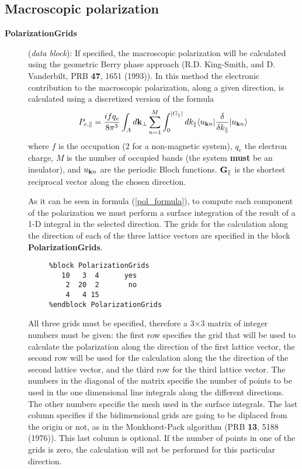 \documentclass[11pt]{article}
\begin{document}
\vspace{5pt}
\subsection{Macroscopic polarization}

\begin{description}

\item[{\bf PolarizationGrids}] ({\it data block}):
If specified, the macroscopic polarization will be calculated using the
geometric Berry phase approach (R.D. King-Smith, and D. Vanderbilt,
PRB {\bf 47}, 1651 (1993)). In this method the electronic
contribution to the macroscopic polarization, along a given direction,
is calculated using
a discretized version of the formula
\begin{equation}
\label{pol_formula}
    P_{e,\parallel}={ifq_e \over 8\pi^3} \int_A d{\bf k}_\perp
    \sum_{n=1}^M \int_0^{|G_\parallel|} dk_{\parallel}
     \langle u_{{\bf k} n} |{\delta \over \delta k_{\parallel}} |
      u_{{\bf k} n} \rangle
\end{equation}
where $f$ is the occupation (2 for a non-magnetic system),
$q_e$ the electron charge, $M$ is the number of occupied bands (the
system {\bf must} be an insulator), and $u_{{\bf k} n}$ are
the periodic Bloch functions. ${\bf G}_\parallel$ is the shortest
reciprocal vector along the chosen direction.

As it can be seen in formula (\ref{pol_formula}), to compute each
component of the polarization we must perform a surface integration
of the result of a 1-D integral in the selected direction.
The grids for the calculation along the direction of each of the
three lattice vectors are specified in the block
{\bf PolarizationGrids}.
\begin{verbatim}
     %block PolarizationGrids
        10   3  4      yes
         2  20  2       no
         4   4 15
     %endblock PolarizationGrids
\end{verbatim}

All three grids must be specified, therefore a 3$\times$3 matrix of
integer numbers must be given: the first row specifies the grid that
will be used to calculate the polarization along the direction of the
first lattice vector, the second row will be used for the calculation
along the the direction of the second lattice vector, and the third
row for the third lattice vector.  The numbers in the diagonal of the
matrix specifie the number of points to be used in the one dimensional
line integrals along the different directions. The other numbers
specifie the mesh used in the surface integrals.  The last column
specifies if the bidimensional grids are going to be diplaced from the
origin or not, as in the Monkhorst-Pack algorithm (PRB {\bf 13}, 5188
(1976)).  This last column is optional.  If the number of points in
one of the grids is zero, the calculation will not be performed for
this particular direction.


\end{description}
\end{document}
